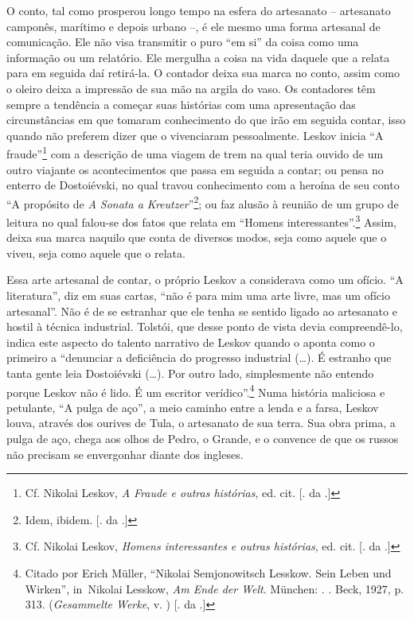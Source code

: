 O conto, tal como prosperou longo tempo na esfera do artesanato --
artesanato camponês, marítimo e depois urbano --, é ele mesmo uma forma
artesanal de comunicação. Ele não visa transmitir o puro ``em si'' da
coisa como uma informação ou um relatório. Ele mergulha a coisa na vida
daquele que a relata para em seguida daí retirá-la. O contador deixa sua
marca no conto, assim como o oleiro deixa a impressão de sua mão na
argila do vaso. \label{supra}Os contadores têm sempre a tendência a começar suas
histórias com uma apresentação das circunstâncias em que tomaram
conhecimento do que irão em seguida contar, isso quando não preferem
dizer que o vivenciaram pessoalmente. Leskov inicia ``A
fraude''\footnote{Cf. Nikolai Leskov, \emph{A Fraude e outras
  histórias}, ed. cit. [. da .]} com a descrição de uma viagem de
trem na qual teria ouvido de um outro viajante os acontecimentos que
passa em seguida a contar; ou pensa no enterro de Dostoiévski, no qual
travou conhecimento com a heroína de seu conto ``A propósito de \emph{A
Sonata a Kreutzer}''\footnote{Idem, ibidem. [. da .]}; ou faz
alusão à reunião de um grupo de leitura no qual falou-se dos fatos que
relata em ``Homens interessantes''.\footnote{Cf. Nikolai Leskov,
  \emph{Homens interessantes e outras histórias}, ed. cit. [. da
  .]} Assim, deixa sua marca naquilo que conta de diversos modos,
seja como aquele que o viveu, seja como aquele que o relata.

Essa arte artesanal de contar, o próprio Leskov a considerava como um
ofício. ``A literatura'', diz em suas cartas, ``não é para mim uma arte
livre, mas um ofício artesanal''. Não é de se estranhar que ele tenha se
sentido ligado ao artesanato e hostil à técnica industrial. Tolstói, que
desse ponto de vista devia compreendê-lo, indica este aspecto do talento
narrativo de Leskov quando o aponta como o primeiro a ``denunciar a
deficiência do progresso industrial (\ldots{}). É estranho que tanta gente
leia Dostoiévski (\ldots{}). Por outro lado, simplesmente não entendo porque
Leskov não é lido. É um escritor verídico''.\footnote{Citado por Erich
  Müller, ``Nikolai Semjonowitsch Lesskow. Sein Leben und Wirken'',
  in~Nikolai Lesskow, \emph{Am Ende der Welt}. München: . . Beck, 1927,
  p. 313. (\emph{Gesammelte Werke}, v. ) [. da .]} Numa
história maliciosa e petulante, ``A pulga de aço'', a meio caminho entre
a lenda e a farsa, Leskov louva, através dos ourives de Tula, o
artesanato de sua terra. Sua obra prima, a pulga de aço, chega aos olhos
de Pedro, o Grande, e o convence de que os russos não precisam se
envergonhar diante dos ingleses.

